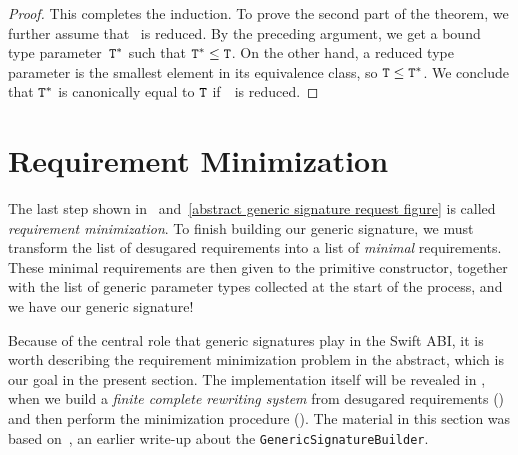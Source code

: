 \documentclass[../generics]{subfiles}
\begin{document}
\begin{proof}
This completes the induction. To prove the second part of the theorem, we further assume that \tT\ is reduced. By the preceding argument, we get a bound type parameter~$\texttt{T}^*$ such that $\texttt{T}^*\le\texttt{T}$. On the other hand, a reduced type parameter is the smallest element in its equivalence class, so $\texttt{T}\le\texttt{T}^*$. We conclude that $\texttt{T}^*$ is canonically equal to $\texttt{T}$ if~\tT\ is reduced.
\end{proof}

\section{Requirement Minimization}\label{minimal requirements}

The last step shown in ~and~\ref{abstract generic signature request figure} is called \emph{requirement minimization}. To finish building our generic signature, we must transform the list of desugared requirements into a list of \emph{minimal} requirements. These minimal requirements are then given to the primitive constructor, together with the list of generic parameter types collected at the start of the process, and we have our generic signature!

Because of the central role that generic signatures play in the Swift ABI, it is worth describing the requirement minimization problem in the abstract, which is our goal in the present section. The implementation itself will be revealed in , when we build a \emph{finite complete rewriting system} from desugared requirements () and then perform the minimization procedure (). The material in this section was based on~\cite{gensig}, an earlier write-up about the \texttt{GenericSignatureBuilder}.
\end{document}
